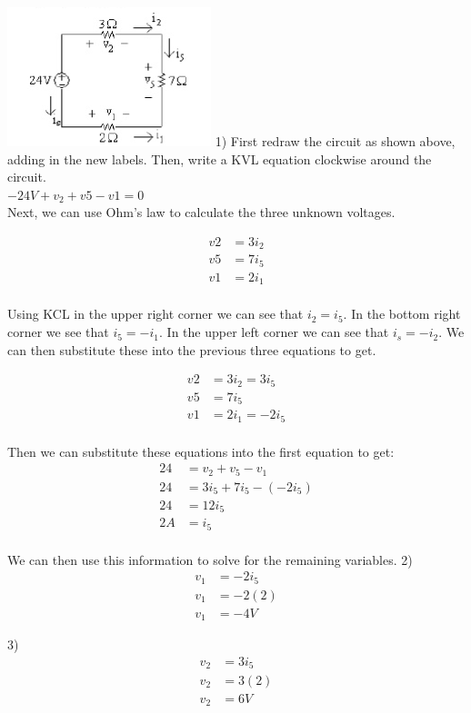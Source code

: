 \includegraphics[scale=0.25]{img/c2/a3}
1) First redraw the circuit as shown above, adding in the new labels. Then, write a KVL equation
clockwise around the circuit. 
\\ \( -24 V + v_2 + v5 - v1 = 0 \)\\
Next, we can use Ohm's law to calculate the three unknown voltages. 

\begin{align*}
	v2 &= 3i_2 \\
	v5 &= 7i_5 \\
	v1 &= 2i_1 \\
\end{align*}

Using KCL in the upper right corner we can see that $i_2 = i_5$. In the bottom right corner we see
that $i_5 = -i_1$. In the upper left corner we can see that $i_s = -i_2$. We can then substitute
these into the previous three equations to get. 

\begin{align*}
	v2 &= 3i_2 = 3i_5 \\
	v5 &= 7i_5 \\
	v1 &= 2i_1 = -2i_5\\
\end{align*} 

Then we can substitute these equations into the first equation to get:
\begin{align*}
	24 &= v_2 + v_5 - v_1 \\
	24 &= 3i_5 + 7i_5 - (-2i_5) \\
	24 &= 12i_5 \\
	2 A &= i_5 \\
\end{align*}

We can then use this information to solve for the remaining variables. 
2) 
\begin{align*}
	v_1 &= -2i_5 \\
	v_1 &= -2(2) \\
	v_1 &= -4 V
\end{align*}

3)
\begin{align*}
	v_2 &= 3i_5 \\
	v_2 &= 3(2) \\
	v_2 &= 6 V \\
\end{align*}

